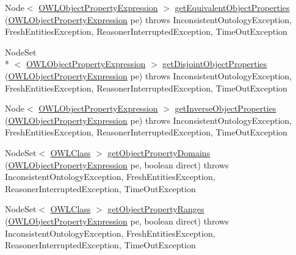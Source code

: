 \begin{DoxyCompactItemize}
\item 
Node$<$ \hyperlink{interfaceorg_1_1semanticweb_1_1owlapi_1_1model_1_1_o_w_l_object_property_expression}{O\-W\-L\-Object\-Property\-Expression} $>$ \hyperlink{classorg_1_1semanticweb_1_1owlapi_1_1reasoner_1_1structural_1_1_structural_reasoner_af258423eb19191a677ca79ea792cb1e2}{get\-Equivalent\-Object\-Properties} (\hyperlink{interfaceorg_1_1semanticweb_1_1owlapi_1_1model_1_1_o_w_l_object_property_expression}{O\-W\-L\-Object\-Property\-Expression} pe)  throws Inconsistent\-Ontology\-Exception, Fresh\-Entities\-Exception, Reasoner\-Interrupted\-Exception, Time\-Out\-Exception 
\item 
Node\-Set\\*
$<$ \hyperlink{interfaceorg_1_1semanticweb_1_1owlapi_1_1model_1_1_o_w_l_object_property_expression}{O\-W\-L\-Object\-Property\-Expression} $>$ \hyperlink{classorg_1_1semanticweb_1_1owlapi_1_1reasoner_1_1structural_1_1_structural_reasoner_a143737166aaabb1f689296f023defe6a}{get\-Disjoint\-Object\-Properties} (\hyperlink{interfaceorg_1_1semanticweb_1_1owlapi_1_1model_1_1_o_w_l_object_property_expression}{O\-W\-L\-Object\-Property\-Expression} pe)  throws Inconsistent\-Ontology\-Exception, Fresh\-Entities\-Exception, Reasoner\-Interrupted\-Exception, Time\-Out\-Exception 
\item 
Node$<$ \hyperlink{interfaceorg_1_1semanticweb_1_1owlapi_1_1model_1_1_o_w_l_object_property_expression}{O\-W\-L\-Object\-Property\-Expression} $>$ \hyperlink{classorg_1_1semanticweb_1_1owlapi_1_1reasoner_1_1structural_1_1_structural_reasoner_a64341c775b8b42a495bba21cf8fa7b33}{get\-Inverse\-Object\-Properties} (\hyperlink{interfaceorg_1_1semanticweb_1_1owlapi_1_1model_1_1_o_w_l_object_property_expression}{O\-W\-L\-Object\-Property\-Expression} pe)  throws Inconsistent\-Ontology\-Exception, Fresh\-Entities\-Exception, Reasoner\-Interrupted\-Exception, Time\-Out\-Exception 
\item 
Node\-Set$<$ \hyperlink{interfaceorg_1_1semanticweb_1_1owlapi_1_1model_1_1_o_w_l_class}{O\-W\-L\-Class} $>$ \hyperlink{classorg_1_1semanticweb_1_1owlapi_1_1reasoner_1_1structural_1_1_structural_reasoner_a764718d55b8610aee92a770f0a48134d}{get\-Object\-Property\-Domains} (\hyperlink{interfaceorg_1_1semanticweb_1_1owlapi_1_1model_1_1_o_w_l_object_property_expression}{O\-W\-L\-Object\-Property\-Expression} pe, boolean direct)  throws Inconsistent\-Ontology\-Exception, Fresh\-Entities\-Exception, Reasoner\-Interrupted\-Exception, Time\-Out\-Exception 
\item 
Node\-Set$<$ \hyperlink{interfaceorg_1_1semanticweb_1_1owlapi_1_1model_1_1_o_w_l_class}{O\-W\-L\-Class} $>$ \hyperlink{classorg_1_1semanticweb_1_1owlapi_1_1reasoner_1_1structural_1_1_structural_reasoner_acd2d3a5c7395d3dcccabceccaad2cf99}{get\-Object\-Property\-Ranges} (\hyperlink{interfaceorg_1_1semanticweb_1_1owlapi_1_1model_1_1_o_w_l_object_property_expression}{O\-W\-L\-Object\-Property\-Expression} pe, boolean direct)  throws Inconsistent\-Ontology\-Exception, Fresh\-Entities\-Exception, Reasoner\-Interrupted\-Exception, Time\-Out\-Exception 

\end{DoxyCompactItemize}
